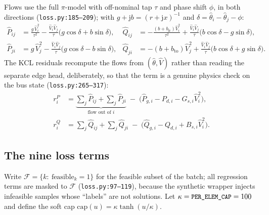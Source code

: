 \documentclass[11pt]{article}
\newcommand{\pred}[1]{\widehat{#1}}
\newcommand{\code}[1]{\texttt{\small #1}}
\begin{document}
Flows use the full $\pi$-model with off-nominal tap $\tau$ and phase shift $\phi$, in both
directions (\code{loss.py:185--209}); with $g+\mathrm{j}b=(r+\mathrm{j}x)^{-1}$ and
$\delta=\pred\theta_i-\pred\theta_j-\phi$:
\begin{align}
\pred{P}_{ij}&=\frac{g\,\pred{V}_i^2}{\tau^2}-\frac{\pred{V}_i\pred{V}_j}{\tau}\big(g\cos\delta+b\sin\delta\big),
&
\pred{Q}_{ij}&=-\frac{(b+b_{\mathrm{fr}})\pred{V}_i^2}{\tau^2}+\frac{\pred{V}_i\pred{V}_j}{\tau}\big(b\cos\delta-g\sin\delta\big),
\label{eq:sfm-flow-ij}\\
\pred{P}_{ji}&=g\,\pred{V}_j^2-\frac{\pred{V}_i\pred{V}_j}{\tau}\big(g\cos\delta-b\sin\delta\big),
&
\pred{Q}_{ji}&=-(b+b_{\mathrm{to}})\pred{V}_j^2+\frac{\pred{V}_i\pred{V}_j}{\tau}\big(b\cos\delta+g\sin\delta\big).
\label{eq:sfm-flow-ji}
\end{align}
The KCL residuals recompute the flows from $(\pred\theta,\pred{V})$ rather than reading the
separate edge head, deliberately, so that the term is a genuine physics check on the bus
state (\code{loss.py:265--317}):
\begin{align}
r^P_i &= \underbrace{\textstyle\sum_{j}\pred{P}_{ij}+\sum_j \pred{P}_{ji}}_{\text{flow out of }i}
\;-\;\Big(\pred{P}_{g,i}-P_{d,i}-G_{s,i}\pred{V}_i^2\Big),
\label{eq:sfm-rp}\\
r^Q_i &= \textstyle\sum_{j}\pred{Q}_{ij}+\sum_j \pred{Q}_{ji}
\;-\;\Big(\pred{Q}_{g,i}-Q_{d,i}+B_{s,i}\pred{V}_i^2\Big).
\label{eq:sfm-rq}
\end{align}

\subsection{The nine loss terms}

Write $\mathcal{F}=\{k:\ \text{feasible}_k=1\}$ for the feasible subset of the batch; all
regression terms are masked to $\mathcal{F}$ (\code{loss.py:97--119}), because the synthetic
wrapper injects infeasible samples whose ``labels'' are not solutions. Let
$\kappa=\code{PER\_ELEM\_CAP}=100$ and define the soft cap
$\mathrm{cap}(u)=\kappa\tanh(u/\kappa)$.
\end{document}
